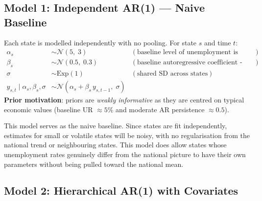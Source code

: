 \documentclass[10pt]{article}
\begin{document}
\subsection{Model 1: Independent AR(1) --- Naive Baseline}
Each state is modelled independently with no pooling. For state $s$ and
time $t$:
\begin{align*}
  \alpha_s &\sim \mathcal{N}(5,\; 3) & (\text{baseline level of unemployment is around 5\%}) \\
  \beta_s  &\sim \mathcal{N}(0.5,\; 0.3) & (\text{baseline autoregressive coefficient - moderate persistence}) \\
  \sigma   &\sim \mathrm{Exp}(1)  & (\text{shared SD across states}) \\[4pt]
  y_{s,t} \mid \alpha_s, \beta_s, \sigma
           &\sim \mathcal{N}\!\left(\alpha_s + \beta_s\, y_{s,t-1},\; \sigma\right)
\end{align*}
\textbf{Prior motivation}: priors are
\textit{weakly informative} as they are centred on typical economic values
(baseline UR $\approx5\%$ and moderate AR persistence $\approx0.5$).

This model serves as the naive baseline. Since states are fit independently,
estimates for small or volatile states will be noisy, with no
regularisation from the national trend or neighbouring states. 
This model does allow states whose unemployment rates genuinely
differ from the national picture to have their 
own parameters without being pulled toward the national mean.

\subsection{Model 2: Hierarchical AR(1) with Covariates}
\end{document}
